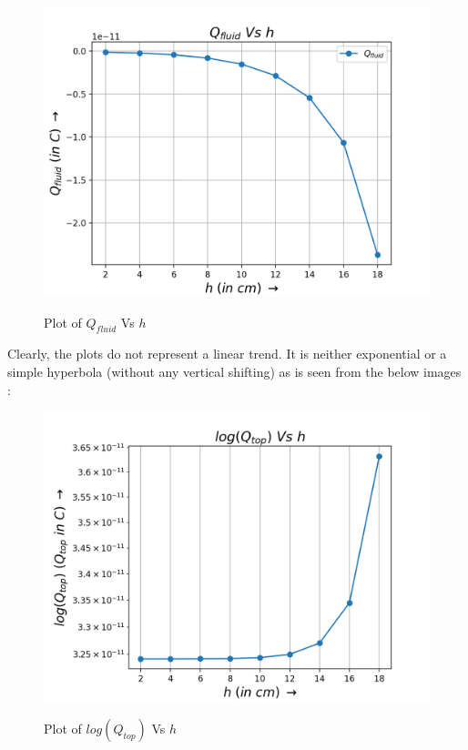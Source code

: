 \documentclass[11pt, a4paper]{article}
\begin{document}
\begin{figure}[H]
  \centering
  \includegraphics[scale=0.6]{qfluid.png}
  \label{fig:qfluid}
  \caption{Plot of $Q_{fluid}$ Vs $h$}
\end{figure}
Clearly, the plots do not represent a linear trend. It is neither exponential or a simple hyperbola (without any vertical shifting) as is seen from the below images :
\begin{figure}[H]
  \centering
  \includegraphics[scale=0.6]{qtop_semilog.png}
  \label{fig:qtop_semilog}
  \caption{Plot of $log(Q_{top})$ Vs $h$}
\end{figure}
\end{document}
